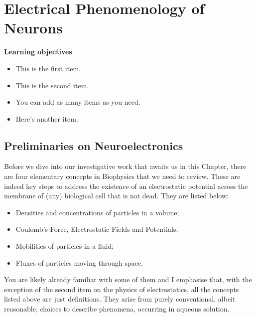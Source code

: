 \chapter{Electrical Phenomenology of Neurons}\label{phen} %


\vspace{2cm} %

\begin{svgraybox}
{\bf{Learning objectives}}
\begin{itemize}
	\item This is the first item.
	\item This is the second item.
	\item You can add as many items as you need.
	\item Here's another item.
  \end{itemize}
\end{svgraybox}

\clearpage

\section{Preliminaries on Neuroelectronics}

Before we dive into our investigative work that awaits us in this Chapter, there are four elementary concepts in Biophysics that we need to review. These are indeed key steps to address the existence of an electrostatic potential across the membrane of (any) biological cell that is not dead. They are listed below:

\begin{itemize}
	\item Densities and concentrations of particles in a volume; 
	\item Coulomb's Force, Electrostatic Fields and Potentials; 
	\item Mobilities of particles in a fluid;
	\item Fluxes of particles moving through space.
\end{itemize}

You are likely already familiar with some of them and I emphasise that, with the exception of the second item on the physics of electrostatics, all the concepts listed above are just definitions. They arise from purely conventional, albeit reasonable, choices to describe phenomena, occurring in aqueous solution.

